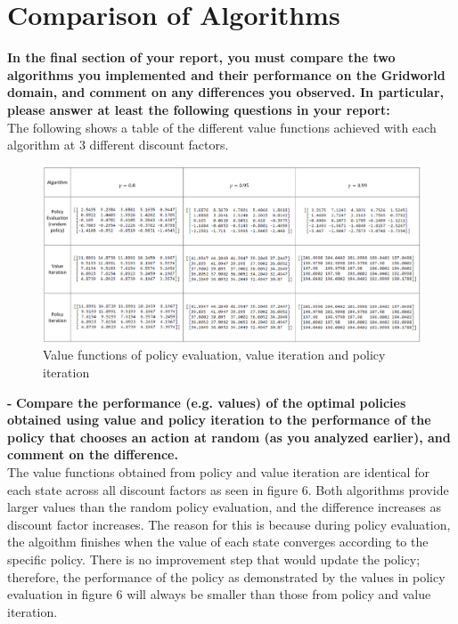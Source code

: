 \documentclass[11pt]{article}
\begin{document}
\newpage
\section{Comparison of Algorithms}
\textbf{In the final section of your report, you must compare the two algorithms you
implemented and their performance on the Gridworld domain, and comment on any
differences you observed. In particular, please answer at least the following
questions in your report:}
\\

\noindent
The following shows a table of the different value functions achieved with each algorithm at 
3 different discount factors.\\

\begin{figure}[h]
\includegraphics[scale=0.255]{value_functions}
\centering
\caption{Value functions of policy evaluation, value iteration and policy iteration}
\end{figure}

\noindent
\textbf{-}
\noindent
\textbf{Compare the performance (e.g. values) of the optimal policies obtained
using value and policy iteration to the performance of the policy that chooses
an action at random (as you analyzed earlier), and comment on the difference.}
\\

\noindent
The value functions obtained from policy and value iteration are identical for
each state across all discount factors as seen in figure 6. Both algorithms
provide larger values than the random policy evaluation, and the difference
increases as discount factor increases. The reason for this is because during
policy evaluation, the algoithm finishes when the value of each state converges
according to the specific policy. There is no improvement step that would update
the policy; therefore, the performance of the policy as demonstrated by the
values in policy evaluation in figure 6 will always be smaller than those from
policy and value iteration.\\
\end{document}
